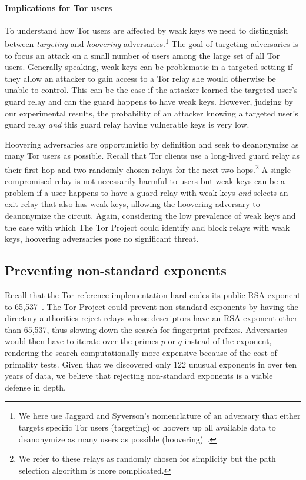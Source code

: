 \paragraph{Implications for Tor users}
To understand how Tor users are affected by weak keys we need to distinguish
between \emph{targeting} and \emph{hoovering} adversaries.\footnote{We here use
Jaggard and Syverson's nomenclature of an adversary that either targets
specific Tor users (targeting) or hoovers up all available data to
deanonymize as many users as possible (hoovering)~\cite{Jaggard2017a}.}
The goal of targeting adversaries is to focus an attack on a small number of
users among the large set of all Tor users.  Generally speaking, weak keys can
be problematic in a targeted setting if they allow an attacker to gain access to
a Tor relay she would otherwise be unable to control.  This can be the case if
the attacker learned the targeted user's guard relay and can the guard happens
to have weak keys.  However, judging by our experimental results, the
probability of an attacker knowing a targeted user's guard relay \emph{and} this
guard relay having vulnerable keys is very low.

Hoovering adversaries are opportunistic by definition and seek to deanonymize as
many Tor users as possible.  Recall that Tor clients use a long-lived guard
relay as their first hop and two randomly chosen relays for the next two
hops.\footnote{We refer to these relays as randomly chosen for simplicity but
the path selection algorithm is more complicated.}  A single compromised relay
is not necessarily harmful to users but weak keys can be a problem if a user
happens to have a guard relay with weak keys \emph{and} selects an exit relay
that also has weak keys, allowing the hoovering adversary to deanonymize the
circuit.  Again, considering the low prevalence of weak keys and the ease with
which The Tor Project could identify and block relays with weak keys, hoovering
adversaries pose no significant threat.

\subsection{Preventing non-standard exponents}
Recall that the Tor reference implementation hard-codes its public RSA exponent
to 65,537~\cite[\S~0.3]{torspec}.  The Tor Project could prevent non-standard
exponents by having the directory authorities reject relays whose descriptors
have an RSA exponent other than 65,537, thus slowing down the search for
fingerprint prefixes.  Adversaries would then have to iterate over the primes
$p$ or $q$ instead of the exponent, rendering the search computationally
more expensive because of the cost of primality tests.  Given that we discovered
only 122 unusual exponents in over ten years of data, we believe that rejecting
non-standard exponents is a viable defense in depth.

